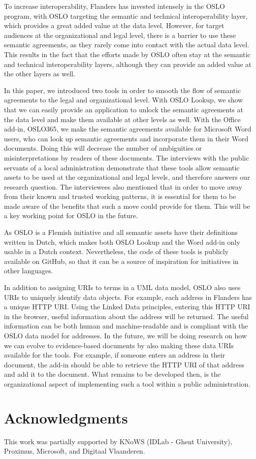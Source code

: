 \documentclass[manuscript]{acmart}
\begin{document}
To increase interoperability, Flanders has invested intensely in the OSLO program, with OSLO targeting the semantic and technical interoperability layer, which provides a great added value at the data level. 
However, for target audiences at the organizational and legal level, there is a barrier to use these semantic agreements, as they rarely come into contact with the actual data level.
This results in the fact that the efforts made by OSLO often stay at the semantic and technical interoperability layers, although they can provide an added value at the other layers as well.

In this paper, we introduced two tools in order to smooth the flow of semantic agreements to the legal and organizational level. 
With OSLO Lookup, we show that we can easily provide an application to  unlock the semantic agreements at the data level and make them available at other levels as well.
With the Office add-in, OSLO365, we make the semantic agreements available for Microsoft Word users, who can look up semantic agreements and incorporate them in their Word documents. 
Doing this will decrease the number of ambiguities or misinterpretations by readers of these documents. 
The interviews with the public servants of a local administration demonstrate that these tools allow semantic assets to be used at the organizational and legal levels, and therefore answers our research question. 
The interviewees also mentioned that in order to move away from their known and trusted working patterns, it is essential for them to be made aware of the benefits that such a move could provide for them. 
This will be a key working point for OSLO in the future.

As OSLO is a Flemish initiative and all semantic assets have their definitions written in Dutch, which makes both OSLO Lookup and the Word add-in only usable in a Dutch context. 
Nevertheless, the code of these tools is publicly available on GitHub, so that it can be a source of inspiration for initiatives in other languages.

In addition to assigning URIs to terms in a UML data model, OSLO also uses URIs to uniquely identify data objects. 
For example, each address in Flanders has a unique HTTP URI. Using the Linked Data principles, entering this HTTP URI in the browser, useful information about the address will be returned. 
The useful information can be both human and machine-readable and is compliant with the OSLO data model for addresses. 
In the future, we will be doing research on how we can evolve to evidence-based documents by also making these data URIs available for the tools. 
For example, if someone enters an address in their document, the add-in should be able to retrieve the HTTP URI of that address and add it to the document.
What remains to be developed then, is the organizational aspect of implementing such a tool within a public administration.

\section{Acknowledgments}

This work was partially supported by KNoWS (IDLab - Ghent University), Proximus, Microsoft, and Digitaal Vlaanderen.



\end{document}
